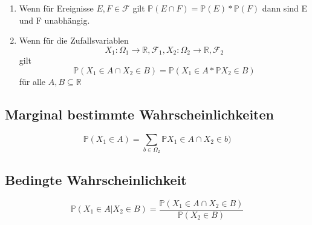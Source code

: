 \documentclass{article}
\begin{document}
\begin{enumerate}
	\item Wenn f\"ur Ereignisse $E, F \in \mathcal{F} $ gilt
	\vspace{3pt}
	$\mathds{P} (E\cap F)= \mathds{P} (E) * \mathds{P} (F)$
	\vspace{3pt}
dann sind E und F unabh\"angig. 

\item Wenn f\"ur die Zufallsvariablen 
\begin{equation*}
X_{1}: \Omega_{1} \longrightarrow \mathds{R}, \mathcal{F}_{1} , X_{2}: \Omega_{2} \longrightarrow \mathds{R}, \mathcal{F}_{2}
\end{equation*}
 gilt
\vspace{3pt}
\begin{equation*}
\mathds{P} ({X_{1} \in A} \cap {X_{2} \in B} ) = \mathds{P} ({X_{1} \in A} * \mathds{P} {X_{2} \in B} )
\end{equation*}
\vspace{3pt}
f\"ur alle $A, B \subseteq \mathds{R}$
\end{enumerate}

\vspace{10pt}

\subsection *{Marginal bestimmte Wahrscheinlichkeiten}

\vspace{5pt}

\begin{equation*}
\mathds{P} ({X_{1} \in A } ) = \sum_{b \in \Omega_{2} } \mathds{P} {X_{1} \in A} \cap {X_{2} \in b})
\end{equation*}

\vspace{10pt}

\subsection *{Bedingte Wahrscheinlichkeit}

\vspace{5pt}

\begin{equation*}
\mathds{P} ({X_{1} \in A } | { X_{2} \in B } ) = \frac {\mathds{P} ( {X_{1} \in A } \cap {X_{2} \in B })} {\mathds{P} ({X_{2} \in B})}
\end{equation*}
\end{document}
